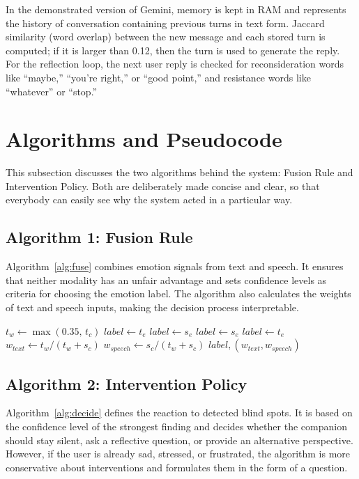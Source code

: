 \documentclass[conference]{IEEEtran}
\begin{document}
In the demonstrated version of Gemini, memory is kept in RAM and represents the history of conversation containing previous turns in text form. Jaccard similarity (word overlap) between the new message and each stored turn is computed; if it is larger than 0.12, then the turn is used to generate the reply. For the reflection loop, the next user reply is checked for reconsideration words like ``maybe,'' ``you're right,'' or ``good point,'' and resistance words like ``whatever'' or ``stop.''

\section{Algorithms and Pseudocode}
This subsection discusses the two algorithms behind the system: Fusion Rule and Intervention Policy. Both are deliberately made concise and clear, so that everybody can easily see why the system acted in a particular way.

\subsection{Algorithm 1: Fusion Rule}
Algorithm~\ref{alg:fuse} combines emotion signals from text and speech. It ensures that neither modality has an unfair advantage and sets confidence levels as criteria for choosing the emotion label. The algorithm also calculates the weights of text and speech inputs, making the decision process interpretable.

\begin{algorithm}[htbp]
\caption{$\textsc{Fuse}(t_e, t_c, s_e, s_c)$}
\label{alg:fuse}
\begin{algorithmic}[1]
\State $t_w \leftarrow \max(0.35,\, t_c)$
    \State $label \leftarrow t_e$
    \State $label \leftarrow s_e$
    \State $label \leftarrow s_e$
\Else
    \State $label \leftarrow t_e$
\EndIf
\State $w_{text} \leftarrow t_w/(t_w + s_c)$
\State $w_{speech} \leftarrow s_c/(t_w + s_c)$
\State \Return $label, (w_{text}, w_{speech})$
\end{algorithmic}
\end{algorithm}

\subsection{Algorithm 2: Intervention Policy}
Algorithm~\ref{alg:decide} defines the reaction to detected blind spots. It is based on the confidence level of the strongest finding and decides whether the companion should stay silent, ask a reflective question, or provide an alternative perspective. However, if the user is already sad, stressed, or frustrated, the algorithm is more conservative about interventions and formulates them in the form of a question.
\end{document}

